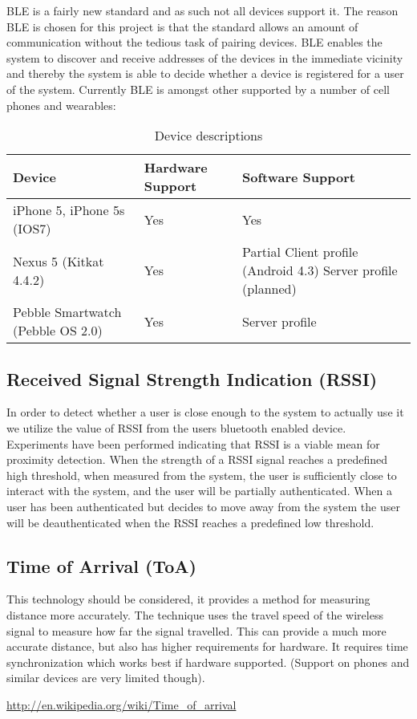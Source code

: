 BLE is a fairly new standard and as such not all devices support it.
The reason BLE is chosen for this project is that the standard allows an amount of communication without the tedious task of pairing devices.
BLE enables the system to discover and receive addresses of the devices in the immediate vicinity and thereby the system is able to decide whether a device is registered for a user of the system.
Currently BLE is amongst other supported by a number of cell phones and wearables:

\begin{table}[!t]
\caption{Device descriptions}
\label{table_example}
\centering
\begin{tabular}{|p{2.3cm}|p{1.3cm}|p{3.8cm}|}
\hline
\textbf{Device} & \textbf{Hardware Support} & \textbf{Software Support}\\
\hline
iPhone 5, iPhone 5s (IOS7) & Yes & Yes\\
\hline
Nexus 5 (Kitkat 4.4.2) & Yes & Partial \newline
Client profile (Android 4.3)
Server profile (planned)\\
\hline
Pebble Smartwatch (Pebble OS 2.0) & Yes & Server profile\\
\hline
\end{tabular}
\end{table}

\subsection{Received Signal Strength Indication (RSSI)}

In order to detect whether a user is close enough to the system to actually use it we utilize the value of RSSI from the users bluetooth enabled device.
Experiments have been performed indicating that RSSI is a viable mean for proximity detection\cite{ref:Takashi}.
When the strength of a RSSI signal reaches a predefined high threshold, when measured from the system, the user is sufficiently close to interact with the system, and the user will be partially authenticated.
When a user has been authenticated but decides to move away from the system the user will be deauthenticated when the RSSI reaches a predefined low threshold.

\subsection{Time of Arrival (ToA)} %
This technology should be considered, it provides a method for measuring distance more accurately.
The technique uses the travel speed of the wireless signal to measure how far the signal travelled.
This can provide a much more accurate distance, but also has higher requirements for hardware.
It requires time synchronization which works best if hardware supported. (Support on phones and similar devices are very limited though). %

\url{http://en.wikipedia.org/wiki/Time_of_arrival}


